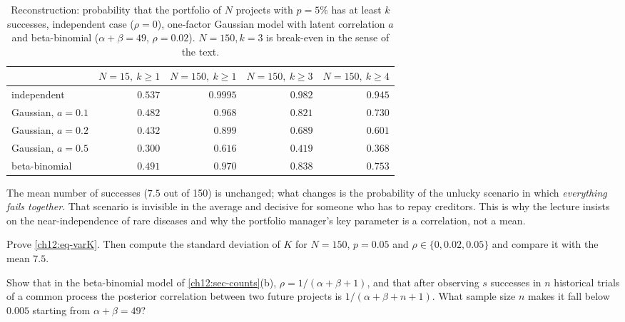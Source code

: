 \begin{paracol}{2}
\begin{table}[ht]
\centering\small
\caption{Reconstruction: probability that the portfolio of $N$ projects with $p=5\%$ has at least $k$ successes,
independent case ($\rho=0$), one-factor Gaussian model with latent correlation $a$ and beta-binomial
($\alpha+\beta=49$, $\rho=0.02$). $N=150,k=3$ is break-even in the sense of the text.}\label{ch12:tab-counts}
\begin{tabular}{@{}lrrrr@{}}
\toprule
& $N=15,\ k\ge1$ & $N=150,\ k\ge1$ & $N=150,\ k\ge3$ & $N=150,\ k\ge4$\\
\midrule
independent          & $0.537$ & $0.9995$ & $0.982$ & $0.945$\\
Gaussian, $a=0.1$    & $0.482$ & $0.968$  & $0.821$ & $0.730$\\
Gaussian, $a=0.2$    & $0.432$ & $0.899$  & $0.689$ & $0.601$\\
Gaussian, $a=0.5$    & $0.300$ & $0.616$  & $0.419$ & $0.368$\\
beta-binomial        & $0.491$ & $0.970$  & $0.838$ & $0.753$\\
\bottomrule
\end{tabular}
\end{table}

\begin{intuition}
The mean number of successes ($7.5$ out of 150) is unchanged; what changes is the probability of the unlucky
scenario in which \emph{everything fails together}. That scenario is invisible in the average and decisive for
someone who has to repay creditors. This is why the lecture insists on the near-independence of rare diseases
 and why the portfolio manager's key parameter is a correlation, not a mean.
\end{intuition}

\begin{exercise}
Prove \eqref{ch12:eq-varK}. Then compute the standard deviation of $K$ for $N=150$, $p=0.05$ and $\rho\in\{0,0.02,0.05\}$
and compare it with the mean $7.5$.
\end{exercise}

\begin{exercise}
Show that in the beta-binomial model of \cref{ch12:sec-counts}(b), $\rho=1/(\alpha+\beta+1)$, and that after observing
$s$ successes in $n$ historical trials of a common process the posterior correlation between two future projects is
$1/(\alpha+\beta+n+1)$. What sample size $n$ makes it fall below $0.005$ starting from $\alpha+\beta=49$?
\end{exercise}


\end{paracol}
